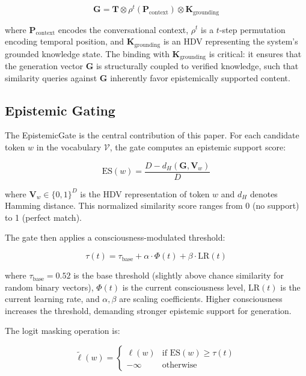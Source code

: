 \documentclass[12pt,a4paper]{article}
\begin{document}
\begin{equation}
\mathbf{G} = \mathbf{T} \otimes \rho^t(\mathbf{P}_{\text{context}}) \otimes \mathbf{K}_{\text{grounding}}
\end{equation}

where $\mathbf{P}_{\text{context}}$ encodes the conversational context, $\rho^t$ is a $t$-step permutation encoding temporal position, and $\mathbf{K}_{\text{grounding}}$ is an HDV representing the system's grounded knowledge state. The binding with $\mathbf{K}_{\text{grounding}}$ is critical: it ensures that the generation vector $\mathbf{G}$ is structurally coupled to verified knowledge, such that similarity queries against $\mathbf{G}$ inherently favor epistemically supported content.

\subsection{Epistemic Gating}

The EpistemicGate is the central contribution of this paper. For each candidate token $w$ in the vocabulary $\mathcal{V}$, the gate computes an epistemic support score:

\begin{equation}
\text{ES}(w) = \frac{D - d_H(\mathbf{G}, \mathbf{V}_w)}{D}
\label{eq:epistemic-support}
\end{equation}

where $\mathbf{V}_w \in \{0,1\}^D$ is the HDV representation of token $w$ and $d_H$ denotes Hamming distance. This normalized similarity score ranges from 0 (no support) to 1 (perfect match).

The gate then applies a consciousness-modulated threshold:

\begin{equation}
\tau(t) = \tau_{\text{base}} + \alpha \cdot \Phi(t) + \beta \cdot \text{LR}(t)
\label{eq:threshold}
\end{equation}

where $\tau_{\text{base}} = 0.52$ is the base threshold (slightly above chance similarity for random binary vectors), $\Phi(t)$ is the current consciousness level, $\text{LR}(t)$ is the current learning rate, and $\alpha, \beta$ are scaling coefficients. Higher consciousness increases the threshold, demanding stronger epistemic support for generation.

The logit masking operation is:

\begin{equation}
\tilde{\ell}(w) = \begin{cases}
\ell(w) & \text{if } \text{ES}(w) \geq \tau(t) \\
-\infty & \text{otherwise}
\end{cases}
\label{eq:masking}
\end{equation}
\end{document}
